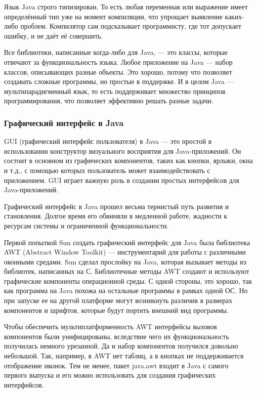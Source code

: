 Язык Java строго типизирован. То есть любая переменная или выражение имеет определённый тип уже на момент компиляции, что упрощает выявление каких-либо проблем. Компилятор сам подсказывает программисту, где тот допускает ошибку, и не даёт её совершить.

Все библиотеки, написанные когда-либо для Java, — это классы, которые отвечают за функциональность языка. Любое приложение на Java — набор классов, описывающих разные объекты. Это хорошо, потому что позволяет создавать сложные программы, но простые в поддержке. И в целом Java — мультипарадигменный язык, то есть поддерживает множество принципов программирования, что позволяет эффективно решать разные задачи.


\subsubsection{Графический интерфейс в Java}

GUI (графический интерфейс пользователя) в Java — это простой в использовании конструктор визуального восприятия для Java-приложений. Он состоит в основном из графических компонентов, таких как кнопки, ярлыки, окна и т.д., с помощью которых пользователь может взаимодействовать с приложением. GUI играет важную роль в создании простых интерфейсов для Java-приложений.

Графический интерфейс в Java прошел весьма тернистый путь развития и становления. Долгое время его обвиняли в медленной работе, жадности к ресурсам системы и ограниченной функциональности.

Первой попыткой Sun создать графический интерфейс для Java была библиотека AWT (Abstract Window Toolkit) — инструментарий для работы с различными оконными средами. Sun сделал прослойку на Java, которая вызывает методы из библиотек, написанных на С. Библиотечные методы AWT создают и используют графические компоненты операционной среды. С одной стороны, это хорошо, так как программа на Java похожа на остальные программы в рамках одной ОС. Но при запуске ее на другой платформе могут возникнуть различия в размерах компонентов и шрифтов, которые будут портить внешний вид программы.

Чтобы обеспечить мультиплатформенность AWT интерфейсы вызовов компонентов были унифицированы, вследствие чего их функциональность получилась немного урезанной. Да и набор компонентов получился довольно небольшой. Так, например, в AWT нет таблиц, а в кнопках не поддерживается отображение иконок. Тем не менее, пакет java.awt входит в Java с самого первого выпуска и его можно использовать для создания графических интерфейсов.

